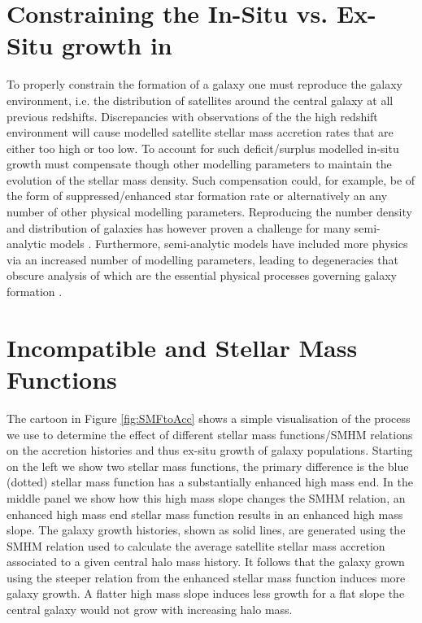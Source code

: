\section{Constraining the In-Situ vs. Ex-Situ growth in \steel}
To properly constrain the formation of a galaxy one must reproduce the galaxy environment, i.e. the distribution of satellites around the central galaxy at all previous redshifts. Discrepancies with observations of the the high redshift environment will cause modelled satellite stellar mass accretion rates that are either too high or too low. To account for such deficit/surplus modelled in-situ growth must compensate though other modelling parameters to maintain the evolution of the stellar mass density. Such compensation could, for example, be of the form of suppressed/enhanced star formation rate or alternatively an any number of other physical modelling parameters. Reproducing the number density and distribution of galaxies has however proven a challenge for many semi-analytic models \citep[e.g.][]{Asquith2018CosmicModels}. Furthermore, semi-analytic models have included more physics via an increased number of modelling parameters, leading to degeneracies that obscure analysis of which are the essential physical processes governing galaxy formation \citep[e.g.][]{Lapi2011Herschel-atlasGalaxies,Gonzalez2011Evolution4}.


\section{Incompatible \LCDM and Stellar Mass Functions}
The cartoon in Figure \ref{fig:SMFtoAcc} shows a simple visualisation of the process we use to determine the effect of different stellar mass functions/SMHM relations on the accretion histories and thus ex-situ growth of galaxy populations. Starting on the left we show two stellar mass functions, the primary difference is the blue (dotted) stellar mass function has a substantially enhanced high mass end. In the middle panel we show how this high mass slope changes the SMHM relation, an enhanced high mass end stellar mass function results in an enhanced high mass slope. The galaxy growth histories, shown as solid lines, are generated using the SMHM relation used to calculate the average satellite stellar mass accretion associated to a given central halo mass history.
It follows that the galaxy grown using the steeper relation from the enhanced stellar mass function induces more galaxy growth. A flatter high mass slope induces less growth for a flat slope the central galaxy would not grow with increasing halo mass.

